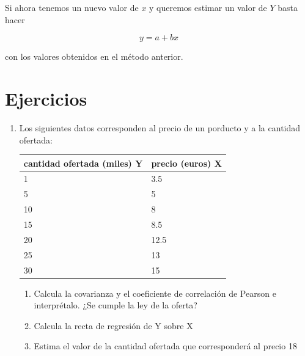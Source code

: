 \documentclass[
]{article}
\providecommand{\tightlist}{%
  \setlength{\itemsep}{0pt}\setlength{\parskip}{0pt}}
\begin{document}
Si ahora tenemos un nuevo valor de \(x\) y queremos estimar un valor de
\(Y\) basta hacer

\[y = a + b x\]

con los valores obtenidos en el método anterior.

\hypertarget{ejercicios}{%
\section{Ejercicios}\label{ejercicios}}

\begin{enumerate}
\def\labelenumi{\arabic{enumi}.}
\item
  Los siguientes datos corresponden al precio de un porducto y a la
  cantidad ofertada:

  \begin{longtable}[]{@{}ll@{}}
  \toprule
  cantidad ofertada (miles) Y & precio (euros) X\tabularnewline
  \midrule
  \endhead
  1 & 3.5\tabularnewline
  5 & 5\tabularnewline
  10 & 8\tabularnewline
  15 & 8.5\tabularnewline
  20 & 12.5\tabularnewline
  25 & 13\tabularnewline
  30 & 15\tabularnewline
  \bottomrule
  \end{longtable}

  \begin{enumerate}
  \def\labelenumii{\arabic{enumii}.}
  \tightlist
  \item
    Calcula la covarianza y el coeficiente de correlación de Pearson e
    interprétalo. ¿Se cumple la ley de la oferta?
  \item
    Calcula la recta de regresión de Y sobre X
  \item
    Estima el valor de la cantidad ofertada que corresponderá al precio
    18
  \end{enumerate}
\end{enumerate}
\end{document}
